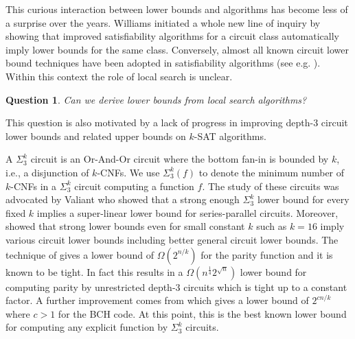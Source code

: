 \documentclass[10pt,a4paper]{article}
\newtheorem{question}{Question}
\begin{document}
This curious interaction between lower bounds and algorithms has become less of a surprise over the years. Williams \cite{Williams13} initiated a whole new line of inquiry by showing that improved satisfiability algorithms for a circuit class automatically imply lower bounds for the same class. Conversely, almost all known circuit lower bound techniques have been adopted in satisfiability algorithms (see e.g. \cite{ImpagliazzoMP12,ChenKKSZ15}). Within this context the role of local search is unclear.

\begin{question}
Can we derive lower bounds from local search algorithms?
\end{question}

This question is also motivated by a lack of progress
in improving depth-3 circuit lower bounds and 
related upper bounds on $k$-SAT algorithms.

\bigskip
{} A $\Sigma^k_3$ circuit is an 
Or-And-Or circuit where the bottom fan-in is bounded by $k$, i.e., a disjunction of $k$-CNFs. We use $\Sigma^k_3(f)$ to denote the minimum number of $k$-CNFs in a $\Sigma^k_3$ circuit computing a function $f$. The study of 
these circuits was advocated by Valiant \cite{Valiant77} who showed that a 
strong enough $\Sigma^k_3$ lower bound for every fixed $k$ implies 
a super-linear lower bound for series-parallel circuits. Moreover, \cite{GKW21circuit} showed that strong lower bounds even for small constant $k$ such as $k=16$ imply various circuit lower bounds including better general circuit lower bounds.
The technique of \cite{PaturiPZ99} gives a lower bound of $\Omega(2^{n/k})$ 
for the parity function and it is known to be 
tight. In fact this results in a $\Omega(n^{\frac{1}{4}} 2^{\sqrt{n}})$ lower bound
for computing parity by unrestricted 
depth-3 circuits which is tight up to a constant factor. 
A further improvement comes from  \cite{PaturiPSZ05} which 
gives a lower bound of $2^{cn/k}$ where $c > 1$ for the BCH code. 
At this point, this is the best known
lower bound for computing any explicit function by $\Sigma^k_3$ circuits.
\end{document}

